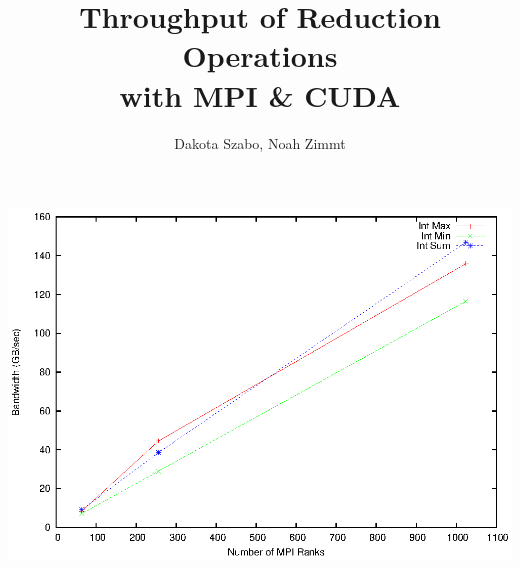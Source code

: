 \documentclass[12pt]{article}
\begin{document}
\author{Dakota Szabo, Noah Zimmt}
\title{Throughput of Reduction Operations \\with MPI \& CUDA}
\maketitle

\includegraphics[width=\textwidth]{mpi/int.eps}
\end{document}

